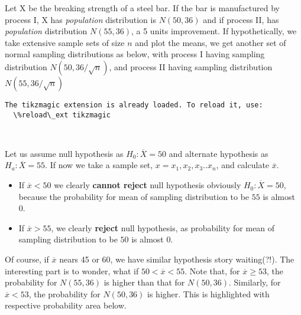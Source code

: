 \documentclass[float=false,crop=false]{standalone}
\begin{document}
Let X be the breaking strength of a steel bar. If the bar is
manufactured by process I, X has \emph{population} distribution is
\(N(50, 36)\) and if process II, has \emph{population} distribution
\(N(55, 36)\), a 5 units improvement. If hypothetically, we take
extensive sample sets of size \(n\) and plot the means, we get another
set of normal sampling distributions as below, with process I having
sampling distribution \(N(50,36/\sqrt{n})\), and process II having
sampling distribution \(N(55, 36/\sqrt{n})\)
    \begin{Verbatim}[commandchars=\\\{\},fontsize=\footnotesize]
The tikzmagic extension is already loaded. To reload it, use:
  \%reload\_ext tikzmagic

    \end{Verbatim}
    \begin{center}
    \end{center}
    { \hspace*{\fill} \\}
    
    Let us assume null hypothesis as \(H_0: \overline{X} = 50\) and
alternate hypothesis as \(H_a: \overline{X} = 55\). If now we take a
sample set, \(x = {x_1, x_2, x_3.. x_n}\), and calculate
\(\overline{x}\).

\begin{itemize}
\tightlist
\item
  If \(\overline{x} < 50\) we clearly \textbf{cannot reject} null
  hypothesis obviously \(H_0: \overline{X} = 50\), because the
  probability for mean of sampling distribution to be \(55\) is almost
  0.
\item
  If \(\overline{x} > 55\), we clearly \textbf{reject} null hypothesis,
  as probability for mean of sampling distribution to be \(50\) is
  almost 0.
\end{itemize}

Of course, if \(\overline{x}\) nears 45 or 60, we have similar
hypothesis story waiting(?!). The interesting part is to wonder, what if
\(50 < \overline{x} < 55\). Note that, for \(\overline{x} \geq 53\), the
probability for \(N(55,36)\) is higher than that for \(N(50,36)\).
Similarly, for \(\overline{x} < 53\), the probability for \(N(50,36)\)
is higher. This is highlighted with respective probability area below.
    \begin{center}
    \end{center}
    { \hspace*{\fill} \\}
    
\end{document}
